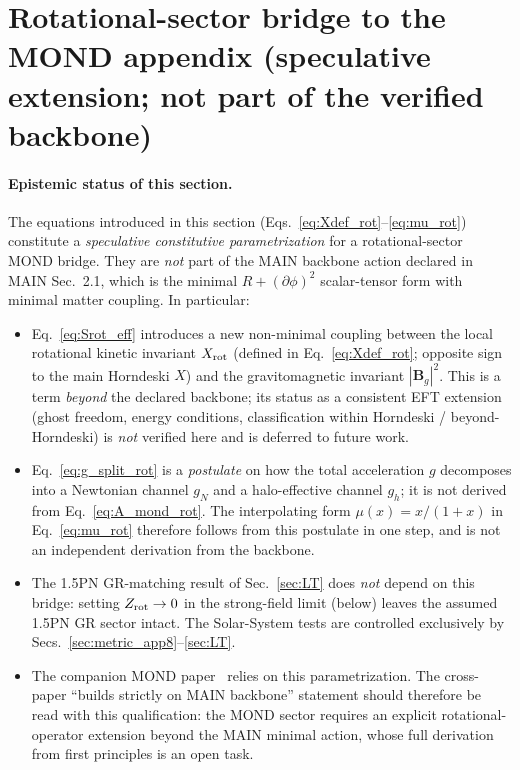 \documentclass[11pt]{article}
\begin{document}
\section{Rotational-sector bridge to the MOND appendix (speculative extension; not part of the verified backbone)}\label{sec:mondrot}

\paragraph{Epistemic status of this section.}
The equations introduced in this section (Eqs.~\eqref{eq:Xdef_rot}--\eqref{eq:mu_rot}) constitute a \emph{speculative constitutive parametrization} for a rotational-sector MOND bridge. They are \emph{not} part of the MAIN backbone action declared in MAIN Sec.~2.1, which is the minimal $R+(\partial\phi)^2$ scalar-tensor form with minimal matter coupling. In particular:
\begin{itemize}
\item Eq.~\eqref{eq:Srot_eff} introduces a new non-minimal coupling between the local rotational kinetic invariant $X_{\rm rot}$ (defined in Eq.~\eqref{eq:Xdef_rot}; opposite sign to the main Horndeski $X$) and the gravitomagnetic invariant $|\bm{B}_g|^2$. This is a term \emph{beyond} the declared backbone; its status as a consistent EFT extension (ghost freedom, energy conditions, classification within Horndeski / beyond-Horndeski) is \emph{not} verified here and is deferred to future work.
\item Eq.~\eqref{eq:g_split_rot} is a \emph{postulate} on how the total acceleration $g$ decomposes into a Newtonian channel $g_N$ and a halo-effective channel $g_h$; it is not derived from Eq.~\eqref{eq:A_mond_rot}. The interpolating form $\mu(x)=x/(1+x)$ in Eq.~\eqref{eq:mu_rot} therefore follows from this postulate in one step, and is not an independent derivation from the backbone.
\item The 1.5PN GR-matching result of Sec.~\ref{sec:LT} does \emph{not} depend on this bridge: setting $Z_{\rm rot}\to 0$ in the strong-field limit (below) leaves the assumed 1.5PN GR sector intact. The Solar-System tests are controlled exclusively by Secs.~\ref{sec:metric_app8}--\ref{sec:LT}.
\item The companion MOND paper~\cite{Lotishvili2026MOND} relies on this parametrization. The cross-paper ``builds strictly on MAIN backbone'' statement should therefore be read with this qualification: the MOND sector requires an explicit rotational-operator extension beyond the MAIN minimal action, whose full derivation from first principles is an open task.
\end{itemize}
\end{document}

